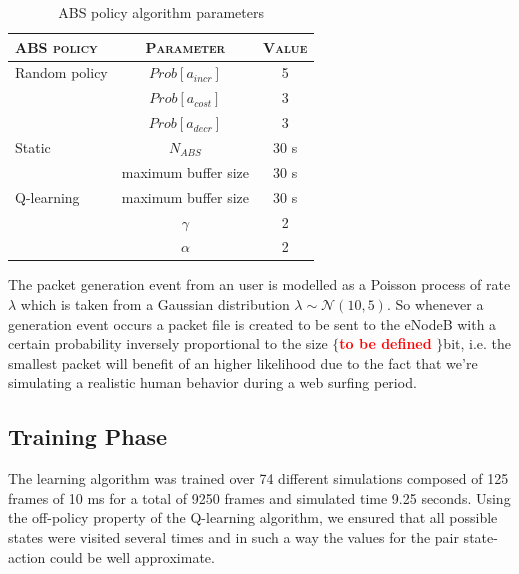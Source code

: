 \documentclass[conference,10pt]{IEEEtran}
\begin{document}
\bgroup
\def\arraystretch{1.2}%
\begin{footnotesize}
	\begin{table}[!htb]
		\centering
		\vspace{10pt}
		\caption{ABS policy algorithm parameters}\label{table:a}
		\begin{tabular}{lcc} 
			\hline
			\multicolumn{1}{l|}{\scshape ABS policy} & \multicolumn{1}{c}{\scshape Parameter}   	& \scshape Value    \\ \hline
			\multicolumn{1}{l|}{Random policy}       & \multicolumn{1}{c|}{$Prob[a_{incr}]$} 		& 5                 \\ 
			\multicolumn{1}{l|}{}                   	& \multicolumn{1}{c|}{$Prob[a_{cost}]$} 			& 3\\
			\multicolumn{1}{l|}{}                   	& \multicolumn{1}{c|}{$Prob[a_{decr}]$} 		& 3       \\ \hline
			\multicolumn{1}{l|}{Static}				& \multicolumn{1}{c|}{$N_{ABS}$} 	 			& 30 s		     \\  \hline   
			\multicolumn{1}{l|}{}					& \multicolumn{1}{c|}{maximum buffer size} 	 & 30 s		     \\           
			\multicolumn{1}{l|}{Q-learning}			& \multicolumn{1}{c|}{maximum buffer size} 	 & 30 s		     \\   
			\multicolumn{1}{l|}{}                   	& \multicolumn{1}{c|}{$\gamma$}                  & 2                 \\ 
			\multicolumn{1}{l|}{}                   	& \multicolumn{1}{c|}{$\alpha$}                  & 2                 \\              
		\end{tabular}
	\end{table}
\end{footnotesize}
\egroup
\noindent The packet generation event from an user is modelled as a Poisson process of rate $\lambda$ which is taken from a Gaussian distribution \textbf{$\lambda \sim \mathcal{N}(10,5)$}. So whenever a generation event occurs a packet file is created to be sent to the eNodeB with a certain probability inversely proportional to the size $\lbrace$\textcolor{red}{\textbf{to be defined}} $\rbrace$bit, i.e. the smallest packet will benefit of an higher likelihood due to the fact that we're simulating a realistic human behavior during a web surfing period.\\

\subsection{Training Phase}
The learning algorithm was trained over 74 different simulations composed of 125 frames of 10 ms for a total of 9250 frames and simulated time 9.25 seconds.
Using the off-policy property of the Q-learning algorithm, we ensured that all possible states were visited several times and in such a way the values for the pair state-action could be well approximate.
\end{document}

